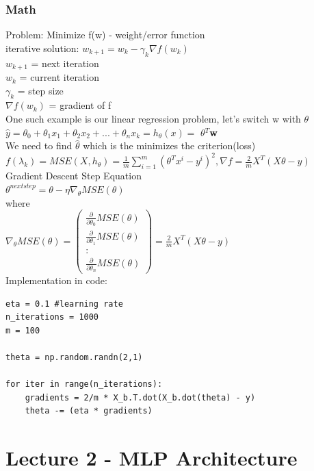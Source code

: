 \documentclass[article]{llncs}
\begin{document}
\subsubsection{Math}
Problem: Minimize f(w) - weight/error function\\
iterative solution: $w_{k+1} = w_k - \gamma_k \nabla f(w_k)$\\
$w_{k+1}$ = next iteration \\
$w_{k}$ = current iteration \\
$\gamma_k$ = step size \\
$\nabla f(w_k)$ = gradient of f\\
One such example is our linear regression problem, let's switch w with $\theta$\\
$\hat{y} = \theta_0 + \theta_1x_1+\theta_2x_2+...+\theta_nx_k = h_\theta(x) = $ \textbf{$\theta$}$^T$\textbf{w}\\
We need to find $\hat{\theta}$ which is the minimizes the criterion(loss)\\
$f(\lambda_k) = MSE(X, h_\theta) = \frac{1}{m}\sum^m_{i=1}(\theta^Tx^{i}-y^i)^2, \nabla f = \frac{2}{m}X^T(X\theta-y)$\\
Gradient Descent Step Equation\\
$\theta^{nextstep} = \theta - \eta\nabla_\theta MSE(\theta)$\\
where\\
$\nabla_\theta MSE(\theta) = \begin{pmatrix}
\frac{\partial}{\partial \theta_0} MSE(\theta)\\
\frac{\partial}{\partial \theta_1} MSE(\theta)\\
: \\
\frac{\partial}{\partial \theta_n} MSE(\theta)
\end{pmatrix} = \frac{2}{m} X^T(X\theta-y)$\\
Implementation in code:\\
\begin{verbatim}
eta = 0.1 #learning rate
n_iterations = 1000
m = 100

theta = np.random.randn(2,1)

for iter in range(n_iterations):
    gradients = 2/m * X_b.T.dot(X_b.dot(theta) - y)
    theta -= (eta * gradients)
\end{verbatim}

\section{Lecture 2 - MLP Architecture}
\end{document}
